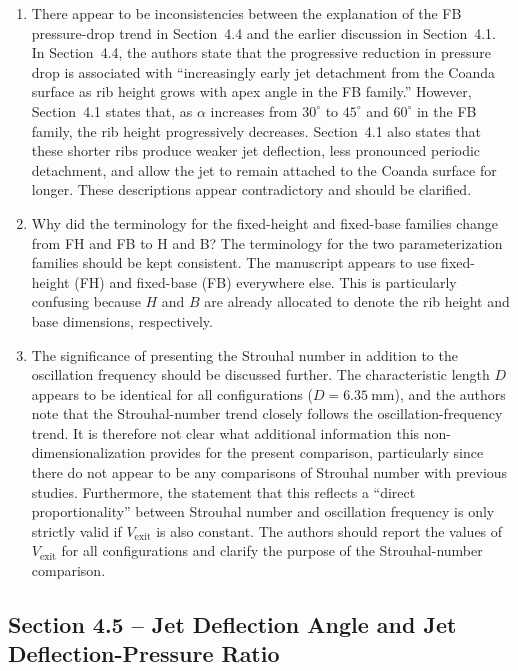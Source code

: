 \documentclass[11pt]{article}
\begin{document}
	\begin{enumerate}
		\item There appear to be inconsistencies between the explanation of the FB pressure-drop trend in Section~4.4 and the earlier discussion in Section~4.1. In Section~4.4, the authors state that the progressive reduction in pressure drop is associated with ``increasingly early jet detachment from the Coanda surface as rib height grows with apex angle in the FB family.'' However, Section~4.1 states that, as $\alpha$ increases from $30^\circ$ to $45^\circ$ and $60^\circ$ in the FB family, the rib height progressively decreases. Section~4.1 also states that these shorter ribs produce weaker jet deflection, less pronounced periodic detachment, and allow the jet to remain attached to the Coanda surface for longer. These descriptions appear contradictory and should be clarified.
		
		\item Why did the terminology for the fixed-height and fixed-base families change from FH and FB to H and B? The terminology for the two parameterization families should be kept consistent. The manuscript appears to use fixed-height (FH) and fixed-base (FB) everywhere else. This is particularly confusing because $H$ and $B$ are already allocated to denote the rib height and base dimensions, respectively. 
		
		\item The significance of presenting the Strouhal number in addition to the oscillation frequency should be discussed further. The characteristic length $D$ appears to be identical for all configurations ($D=6.35~\mathrm{mm}$), and the authors note that the Strouhal-number trend closely follows the oscillation-frequency trend. It is therefore not clear what additional information this non-dimensionalization provides for the present comparison, particularly since there do not appear to be any comparisons of Strouhal number with previous studies. Furthermore, the statement that this reflects a ``direct proportionality'' between Strouhal number and oscillation frequency is only strictly valid if $V_{\mathrm{exit}}$ is also constant. The authors should report the values of $V_{\mathrm{exit}}$ for all configurations and clarify the purpose of the Strouhal-number comparison.
	\end{enumerate}
	
	\subsection*{Section 4.5 -- Jet Deflection Angle and Jet Deflection-Pressure Ratio}
	
\end{document}
